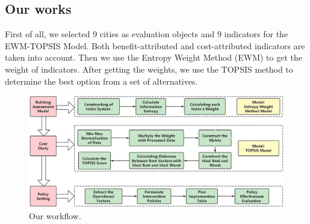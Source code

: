 \subsection{Our works}
First of all, we selected 9 cities as evaluation objects and 9 indicators for the EWM-TOPSIS Model. Both benefit-attributed and cost-attributed indicators are taken into account. Then we use the Entropy Weight Method (EWM) to get the weight of indicators. After getting the weights, we use the TOPSIS method to determine the best option from a set of alternatives.
\begin{figure}[H]\centering
    \includegraphics[width=1\textwidth]{figures/Flowchart}
    \caption{Our workflow.} \label{fig:figure1}
\end{figure}



